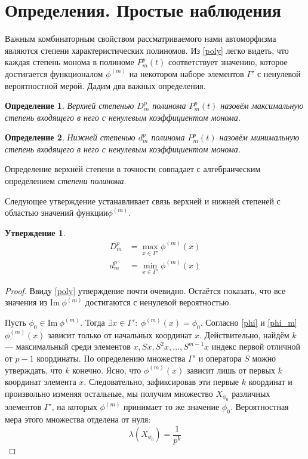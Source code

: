 \documentclass[14pt, a4paper, russian]{report}
\newtheorem{definition}{\indent Определение}
\newtheorem{proposition}{\indent Утверждение}
\begin{document}
\section{Определения. Простые наблюдения}
Важным комбинаторным свойством рассматриваемого нами автоморфизма являются степени характеристических полиномов. Из \cref{poly} легко видеть, что каждая степень монома в полиноме $P_m^p(t)$ соответствует значению, которое достигается функционалом $\phi^{(m)}$ на некотором наборе элементов $\Gamma'$ с ненулевой вероятностной мерой. Дадим два важных определения.
\begin{definition}\label{high_deg}
Верхней степенью $D_m^p$ полинома $P_m^p(t)$ назовём максимальную степень входящего в него с ненулевым коэффициентом монома.
\end{definition}
\begin{definition}\label{low_deg}
Нижней степенью $d_m^p$ полинома $P_m^p(t)$ назовём минимальную степень входящего в него с ненулевым коэффициентом монома.
\end{definition}
Определение верхней степени в точности совпадает с алгебраическим определением \emph{степени полинома}.

Следующее утверждение устанавливает связь верхней и нижней степеней с областью значений функции\nobreakspace$\phi^{(m)}$.
\begin{proposition}\label{ran_phi}
\begin{align*}
D_m^p &= \max\limits_{x \in \Gamma'} \phi^{(m)}(x)\\
d_m^p &= \min\limits_{x \in \Gamma'} \phi^{(m)}(x)
\end{align*}
\end{proposition}
\begin{proof}
Ввиду \cref{poly} утверждение почти очевидно. Остаётся показать, что все значения из $\mathrm{Im\ }\phi^{(m)}$ достигаются с ненулевой вероятностью.

Пусть $\phi_0 \in \mathrm{Im\ }\phi^{(m)}$. Тогда $\exists x \in \Gamma':\ \phi^{(m)}(x) = \phi_0$. Согласно \cref{phi} и \cref{phi_m} $\phi^{(m)}(x)$ зависит только от начальных координат $x$. Действительно, найдём $k$ --- максимальный среди элементов $x, Sx, S^2x, 
\ldots, S^{m-1}x$ индекс первой отличной от $p-1$ координаты. По определению множества $\Gamma'$ и оператора $S$ можно утверждать, что $k$ конечно. Ясно, что $\phi^{(m)}(x)$ зависит лишь от первых $k$ координат элемента $x$. Следовательно, зафиксировав эти первые $k$ координат и произвольно изменяя остальные, мы получим множество $X_{\phi_0}$ различных элементов $\Gamma'$, на которых $\phi^{(m)}$ принимает то же значение $\phi_0$. Вероятностная мера этого множества отделена от нуля: $$\lambda(X_{\phi_0}) = \frac{1}{p^k}$$
\end{proof}
\end{document}
